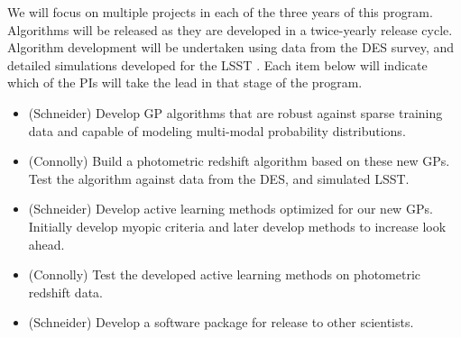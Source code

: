 \documentclass[prd,nofootbib,floatfix,11pt,tightenlines,nofootinbib]{revtex4}
\begin{document}
We will focus on multiple projects in each of the three years of this
program.  Algorithms will be released as they are developed in a
twice-yearly release cycle.  Algorithm development will be undertaken using
data from the DES survey, and detailed simulations developed
for the LSST \cite{connolly10}.  Each item below will indicate which of the
PIs will take the lead in that stage of the program.

\vspace{.5\baselineskip}
\begin{itemize}

\item (Schneider) Develop GP algorithms that are robust against sparse
  training data and capable of modeling multi-modal probability
  distributions.

\item (Connolly) Build a photometric redshift algorithm based on these new
  GPs.  Test the algorithm against data from the DES, and simulated LSST.

\item (Schneider) Develop active learning methods optimized for our new
  GPs.  Initially develop myopic criteria and later develop methods to
  increase look ahead.

\item (Connolly) Test the developed active learning methods on photometric
  redshift data.

\item (Schneider) Develop a software package for release to other scientists.

\end{itemize}
\vspace{.5\baselineskip}
\end{document}
